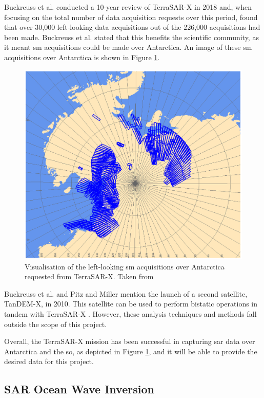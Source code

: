 Buckreuss et al. \cite{Buckreuss2018} conducted a 10-year review of TerraSAR-X in 2018 and, when focusing on the total number of data acquisition requests over this period, found that over 30,000 left-looking data acquisitions out of the 226,000 acquisitions had been made. Buckreuss et al. stated that this benefits the scientific community, as it meant \acf{sm} acquisitions could be made over Antarctica. An image of these \acs{sm} acquisitions over Antarctica is shown in Figure \ref{fig:litReview.sarCharac.satellites.terraSAR.antarcticStripmaps}.

\begin{figure}[H]
    \centering
    \includegraphics[width=.5\linewidth]{Figures/LiteratureReview/Satellites/TerraSAR_Antarctic_Acquisitions.png}
    \caption{Visualisation of the left-looking \ac{sm} acquisitions over Antarctica requested from TerraSAR-X. Taken from \cite{Buckreuss2018}}
    \label{fig:litReview.sarCharac.satellites.terraSAR.antarcticStripmaps}
\end{figure}

Buckreuss et al. \cite{Buckreuss2018} and Pitz and Miller \cite{Pitz2010} mention the launch of a second satellite, TanDEM-X, in 2010. This satellite can be used to perform bistatic operations in tandem with TerraSAR-X \cite{Pitz2010, Buckreuss2018}. However, these analysis techniques and methods fall outside the scope of this project.

Overall, the TerraSAR-X mission has been successful in capturing \acs{sar} data over Antarctica and the \acs{so}, as depicted in Figure \ref{fig:litReview.sarCharac.satellites.terraSAR.antarcticStripmaps}, and it will be able to provide the desired data for this project.

\subsection{SAR Ocean Wave Inversion} \label{subsec:litReview.sarCharac.oceanWaveInversion}

